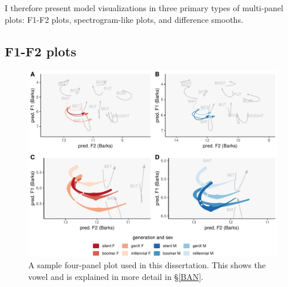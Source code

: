 I therefore present model visualizations in three primary types of multi-panel plots: F1-F2 plots, spectrogram-like plots, and difference smooths.

\subsection{F1-F2 plots}

\begin{figure}[tb!]
    \centering
    \includegraphics[width = 6.5in]{Figures/BAN/BAN_four_panel_plot.pdf}
    \caption[A sample four-panel plot used in this dissertation.]{A sample four-panel plot used in this dissertation. This shows the \ban vowel and is explained in more detail in \S\ref{BAN}.}
    \label{fig:sample_four_panel_plot}
\end{figure}

